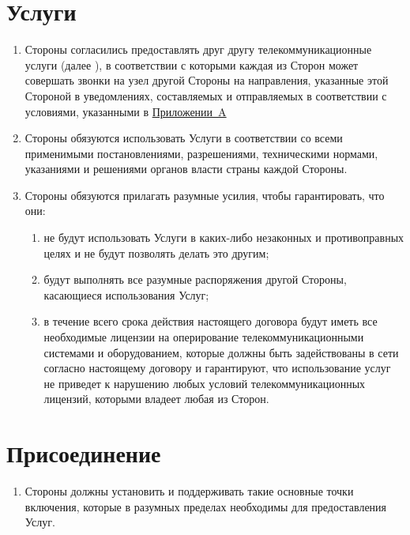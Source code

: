\begin{Form}
   \section{Услуги}
    \begin{enumerate}[label=\thesection.\arabic*.]   
    \item Стороны согласились предоставлять друг другу телекоммуникационные услуги (далее \textbf{\frqq}),
          в соответствии с которыми каждая из Сторон может совершать звонки на узел другой Стороны на направления,
          указанные этой Стороной в уведомлениях, составляемых и отправляемых в соответствии с условиями, указанными в
          \hyperref[anx:a-ru]{\flqq{}Приложении~A\frqq{}}

    \item Стороны обязуются использовать Услуги  в соответствии со всеми применимыми
          постановлениями, разрешениями, техническими нормами, указаниями и решениями органов власти страны каждой
          Стороны.

    \item Стороны обязуются прилагать разумные усилия, чтобы гарантировать, что они:
          \begin{enumerate}[label=\theenumi\arabic*.]
            \item не будут использовать Услуги в каких-либо незаконных и противоправных целях
                  и не будут позволять делать это другим;
            \item будут выполнять все разумные распоряжения другой Стороны, касающиеся использования Услуг;
            \item в течение всего срока действия настоящего договора будут иметь все необходимые лицензии
                  на оперирование телекоммуникационными системами и оборудованием, которые должны быть
                  задействованы в сети согласно настоящему договору и гарантируют, что использование услуг
                  не приведет к нарушению любых условий телекоммуникационных лицензий, которыми владеет любая из Сторон.
          \end{enumerate}
    \end{enumerate}

    
   \section{Присоединение}
    \begin{enumerate}[label=\thesection.\arabic*.]
     \item Стороны  должны установить и поддерживать такие основные точки включения, которые в разумных
           пределах необходимы для предоставления Услуг.


\end{enumerate}
\end{Form}
